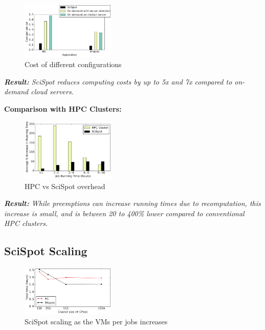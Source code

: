 \begin{figure}
  \centering
  \includegraphics[width=0.4\textwidth]{../graphs/cost-only-bar.pdf}
  \caption{Cost of different configurations}
  \label{fig:cost-only-bar}
\end{figure}

\noindent \emph{ \textbf{Result:} SciSpot reduces computing costs by up to 5x and 7x compared to on-demand cloud servers.}


\noindent \textbf{Comparison with HPC Clusters:}

\begin{figure}[t]
  \centering 
  \includegraphics[width=0.4\textwidth]{../graphs/hpc-vs-scispot.pdf}
  \caption{HPC vs SciSpot overhead}
  \label{fig:hpc-vs-scispot}

\end{figure}

\noindent \emph{ \textbf{Result:} While preemptions can increase running times due to recomputation, this increase is small, and is between 20 to 400\% lower compared to conventional HPC clusters. }


\subsection{SciSpot Scaling}


\begin{figure}
  \includegraphics[width=0.4\textwidth]{../graphs/vm-per-job-scaling.pdf}
  \caption{SciSpot scaling as the VMs per jobs increases}
  \label{fig:vm-per-job-scaling}
\end{figure}

